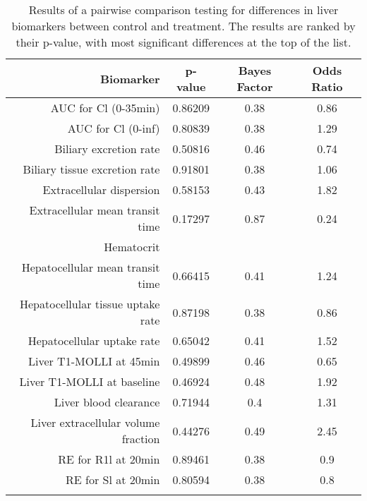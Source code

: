 \documentclass{epflreport}%
\begin{document}
%
\begin{longtable}{rccc}%
\hline%
Biomarker&p{-}value&Bayes Factor&Odds Ratio\\%
\hline%
AUC for Cl (0{-}35min)&0.86209&0.38&0.86\\%
AUC for Cl (0{-}inf)&0.80839&0.38&1.29\\%
Biliary excretion rate&0.50816&0.46&0.74\\%
Biliary tissue excretion rate&0.91801&0.38&1.06\\%
Extracellular dispersion&0.58153&0.43&1.82\\%
Extracellular mean transit time&0.17297&0.87&0.24\\%
Hematocrit&&&\\%
Hepatocellular mean transit time&0.66415&0.41&1.24\\%
Hepatocellular tissue uptake rate&0.87198&0.38&0.86\\%
Hepatocellular uptake rate&0.65042&0.41&1.52\\%
Liver T1{-}MOLLI at 45min&0.49899&0.46&0.65\\%
Liver T1{-}MOLLI at baseline&0.46924&0.48&1.92\\%
Liver blood clearance&0.71944&0.4&1.31\\%
Liver extracellular volume fraction&0.44276&0.49&2.45\\%
RE for R1l at 20min&0.89461&0.38&0.9\\%
RE for Sl at 20min&0.80594&0.38&0.8\\%
\hline%
\caption{Results of a pairwise comparison testing for differences in liver biomarkers between control and treatment. The results are ranked by their p-value, with most significant differences at the top of the list.} \\%
\end{longtable}%
\end{document}
